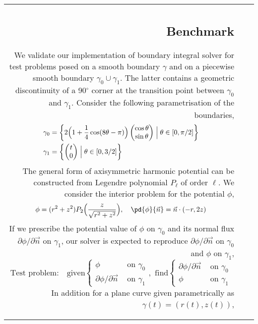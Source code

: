 \documentclass{jfm}
\begin{document}
\begin{table}
\begin{center}
\begin{tabular}{rl|l}
\subsection{Benchmark}
We validate our implementation of boundary integral solver for test problems posed 
on a smooth boundary $\gamma$ and on a piecewise smooth boundary $\gamma_0\cup\gamma_1$.
The latter contains a geometric discontinuity of a 90$^\circ$ corner
at the transition point between $\gamma_0$ and $\gamma_1$.
Consider the following parametrisation of the boundaries,
\begin{align}
\gamma_0&=\left\{
2 \Big(1+\frac{1}{4}\cos(8\theta - \pi)\Big)
\begin{pmatrix}
\cos\theta\\
\sin\theta
\end{pmatrix}
\Bigm|  \theta \in [0,\pi/2]\right\}\\
\gamma_1&=
\left\{
\begin{pmatrix}
t\\0
\end{pmatrix}
\Bigm|  \theta \in [0,3/2]\right\}
\end{align}
The general form of axisymmetric harmonic potential can be constructed from Legendre polynomial $P_\ell$ of order $\ell$.
We consider the interior problem for the potential $\phi$,
\begin{equation}\label{eq:test_parametrisation}
\phi = (r^2+z^2)P_2\Big(\frac{z}{\sqrt{r^2+z^2}}\Big),\quad
\pd{\phi}{\vec{n}} = \vec{n}\cdot (-r , 2 z )
\end{equation}
If we prescribe the potential value of $\phi$ on $\gamma_0$ and 
its normal flux $\partial \phi /\partial \vec{n}$ on $\gamma_1$,
our solver is expected to reproduce $\partial \phi /\partial \vec{n}$ on $\gamma_0$
and $\phi$ on $\gamma_1$,
\begin{equation}\label{eq:test_problem}
\textrm{Test problem:}\quad\textrm{given}\left\{
\begin{aligned}
\phi &\textrm{ on }\gamma_0\\
\partial \phi /\partial \vec{n}&\textrm{ on }\gamma_1
\end{aligned}\right.,
\,\,\textrm{find}\left\{
\begin{aligned}
\partial \phi /\partial \vec{n}&\textrm{ on }\gamma_0\\
\phi &\textrm{ on }\gamma_1
\end{aligned}\right.
\end{equation}
In addition for a plane curve given parametrically as $\gamma(t) = (r(t), z(t))$,

\end{tabular}
\end{center}
\end{table}
\end{document}
